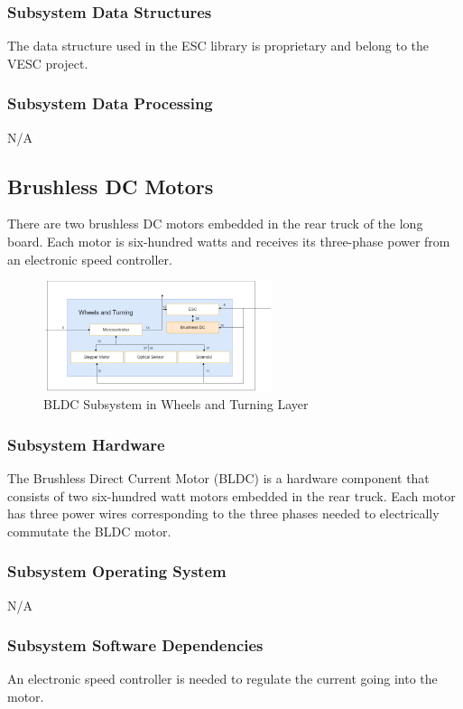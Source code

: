 \subsubsection{Subsystem Data Structures}
The data structure used in the ESC library is proprietary and belong to the VESC project. 

\subsubsection{Subsystem Data Processing}
N/A

\subsection{Brushless DC Motors}
There are two brushless DC motors embedded in the rear truck of the long board. Each motor is six-hundred watts and receives its three-phase power from an electronic speed controller.

\begin{figure}[h!]
	\centering
 	\includegraphics[width=0.60\textwidth]{images/Keaton/BLDC.png}
 \caption{BLDC Subsystem in Wheels and Turning Layer}
\end{figure}

\subsubsection{Subsystem Hardware}
The Brushless Direct Current Motor (BLDC) is a hardware component that consists of two six-hundred watt motors embedded in the rear truck. Each motor has three power wires corresponding to the three phases needed to electrically commutate the BLDC motor.

\subsubsection{Subsystem Operating System}
N/A

\subsubsection{Subsystem Software Dependencies}
An electronic speed controller is needed to regulate the current going into the motor.

